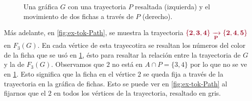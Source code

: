 \begin{figure}[ht!]
    \caption{Una gr\'afica $G$ con una trayectoria $P$ resaltada (izquierda) y
     el movimiento de dos fichas a trav\'es de $P$ (derecho).}
    \label{fig:ex-tok-aux}
\end{figure}
    
M\'as adelante, en \cref{fig:ex-tok-Path}, se muestra la trayectoria
${\color{vino}\bf \{2,3,4\}\xrightarrow[P]{}\{2,4,5\}}$ en $F_3(G)$. En cada
v\'ertice de esta trayecotira se resaltan los n\'umeros del color de la ficha
que se us\'o en \cref{fig:ex-tok-aux}, \'esto para resaltar la relaci\'on entre
la trayectoria de $G$ y la de $F_3(G)$. Observamos que $2$ no est\'a en $A \cap
P =\{3,4\}$ por lo que no se ve en \cref{fig:ex-tok-aux}. Esto significa que la
ficha en el v\'ertice $2$ se queda fija a trav\'es de la trayectoria en la
gr\'afica de fichas. Esto se puede ver en \cref{fig:ex-tok-Path} al fijarnos que
el $2$ en todos los v\'ertices de la trayectoria, resaltado en gris.

